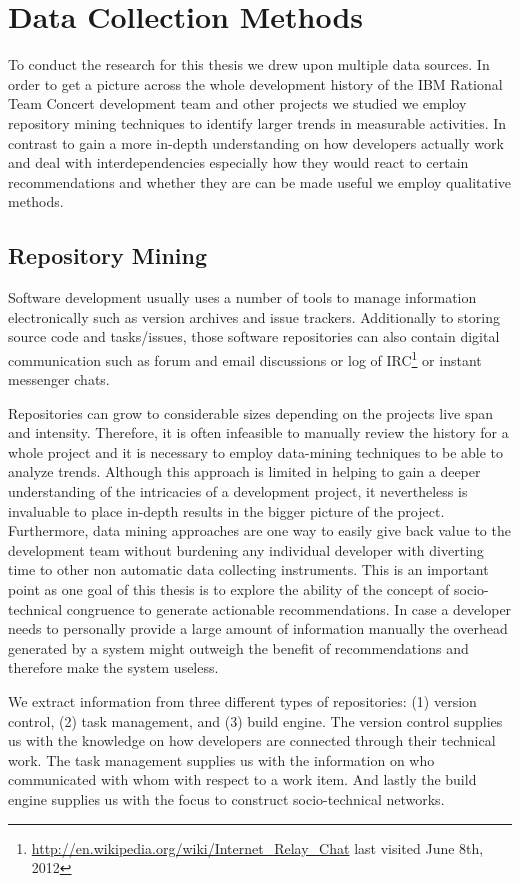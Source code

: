 \section{Data Collection Methods}
\label{c5:sec:datacollection}
To conduct the research for this thesis we drew upon multiple data sources.
In order to get a picture across the whole development history of the IBM Rational Team Concert development team and other projects we studied we employ repository mining techniques to identify larger trends in measurable activities.
In contrast to gain a more in-depth understanding on how developers actually work and deal with interdependencies especially how they would react to certain recommendations and whether they are can be made useful we employ qualitative methods.

\subsection{Repository Mining}
Software development usually uses a number of tools to manage information electronically such as version archives and issue trackers.
Additionally to storing source code and tasks/issues, those software repositories can also contain digital communication such as forum and email discussions or log of IRC\footnote{\url{http://en.wikipedia.org/wiki/Internet_Relay_Chat} last visited June 8th, 2012} or instant messenger chats.

Repositories can grow to considerable sizes depending on the projects live span and intensity. 
Therefore, it is often infeasible to manually review the history for a whole project and it is necessary to employ data-mining techniques to be able to analyze trends.
Although this approach is limited in helping to gain a deeper understanding of the intricacies of a development project, it nevertheless is invaluable to place in-depth results in the bigger picture of the project.
Furthermore, data mining approaches are one way to easily give back value to the development team without burdening any individual developer with diverting time to other non automatic data collecting instruments.
This is an important point as one goal of this thesis is to explore the ability of the concept of socio-technical congruence to generate actionable recommendations.
In case a developer needs to personally provide a large amount of information manually the overhead generated by a system might outweigh the benefit of recommendations and therefore make the system useless.

We extract information from three different types of repositories: (1) version control, (2) task management, and (3) build engine.
The version control supplies us with the knowledge on how developers are connected through their technical work.
The task management supplies us with the information on who communicated with whom with respect to a work item.
And lastly the build engine supplies us with the focus to construct socio-technical networks.

